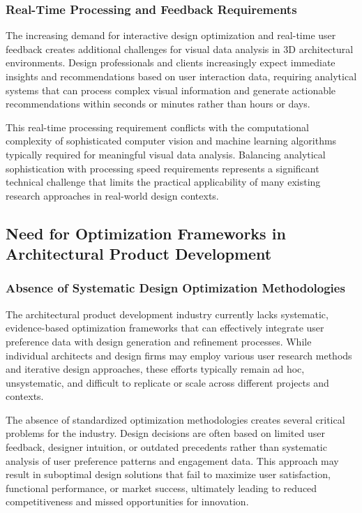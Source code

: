 \subsubsection{Real-Time Processing and Feedback Requirements}
\label{subsubsec:realtime_processing}

The increasing demand for interactive design optimization and real-time user feedback creates additional challenges for visual data analysis in 3D architectural environments. Design professionals and clients increasingly expect immediate insights and recommendations based on user interaction data, requiring analytical systems that can process complex visual information and generate actionable recommendations within seconds or minutes rather than hours or days.

This real-time processing requirement conflicts with the computational complexity of sophisticated computer vision and machine learning algorithms typically required for meaningful visual data analysis. Balancing analytical sophistication with processing speed requirements represents a significant technical challenge that limits the practical applicability of many existing research approaches in real-world design contexts.

\subsection{Need for Optimization Frameworks in Architectural Product Development}
\label{subsec:optimization_frameworks_need}

\subsubsection{Absence of Systematic Design Optimization Methodologies}
\label{subsubsec:systematic_methodologies_absence}

The architectural product development industry currently lacks systematic, evidence-based optimization frameworks that can effectively integrate user preference data with design generation and refinement processes. While individual architects and design firms may employ various user research methods and iterative design approaches, these efforts typically remain ad hoc, unsystematic, and difficult to replicate or scale across different projects and contexts.

The absence of standardized optimization methodologies creates several critical problems for the industry. Design decisions are often based on limited user feedback, designer intuition, or outdated precedents rather than systematic analysis of user preference patterns and engagement data. This approach may result in suboptimal design solutions that fail to maximize user satisfaction, functional performance, or market success, ultimately leading to reduced competitiveness and missed opportunities for innovation.

